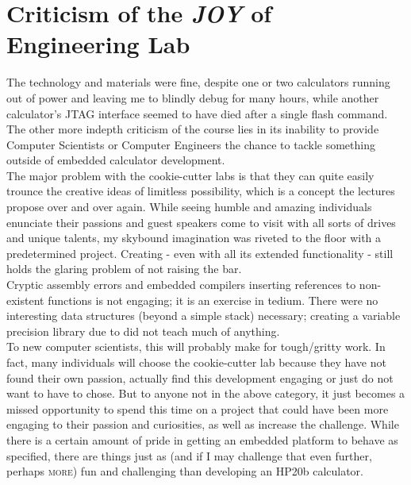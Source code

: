 \documentclass{LibHP20b}
\begin{document}
\section{Criticism of the \emph{\textbf{JOY}} of Engineering Lab}

The technology and materials were fine, despite one or two calculators running out of power and leaving me to blindly debug for many hours, while another calculator's JTAG interface seemed to have died after a single flash command. The other more indepth criticism of the course lies in its inability to provide Computer Scientists or Computer Engineers the chance to tackle something outside of embedded calculator development.\\
The major problem with the cookie-cutter labs is that they can quite easily trounce the creative ideas of limitless possibility, which is a concept the lectures propose over and over again. While seeing humble and amazing individuals enunciate their passions and guest speakers come to visit with all sorts of drives and unique talents, my skybound imagination was riveted to the floor with a predetermined project. Creating \HP{} - even with all its extended functionality - still holds the glaring problem of not raising the bar.\\
Cryptic assembly errors and embedded compilers inserting references to non-existent functions is not engaging; it is an exercise in tedium. There were no interesting data structures (beyond a simple stack) necessary; creating a variable precision library due to  did not teach much of anything. \\
To new computer scientists, this will probably make for tough/gritty work. In fact, many individuals will choose the cookie-cutter lab because they have not found their own passion, actually find this development engaging or just do not want to have to chose. But to anyone not in the above category, it just becomes a missed opportunity to spend this time on a project that could have been more engaging to their passion and curiosities, as well as increase the challenge. While there is a certain amount of pride in getting an embedded platform to behave as specified, there are things just as (and if I may challenge that even further, perhaps \textsc{more}) fun and challenging than developing an HP20b calculator.\\
\end{document}

